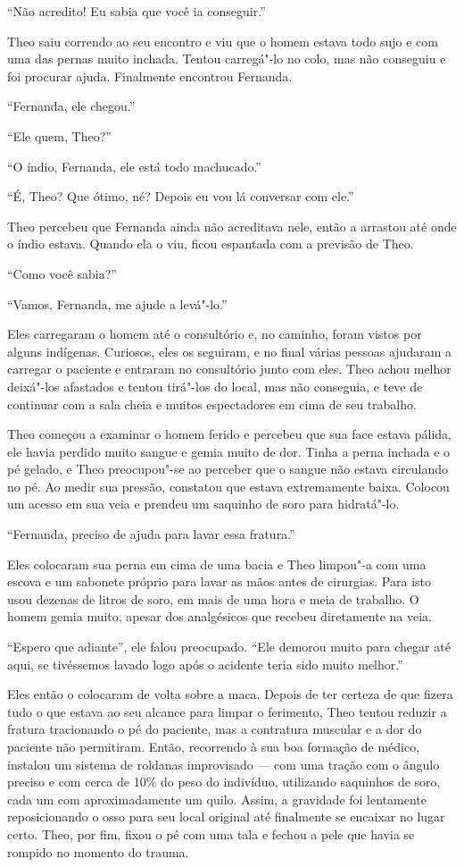 ``Não acredito! Eu sabia que você ia conseguir.''

Theo saiu correndo ao seu encontro e viu que o homem estava todo sujo e
com uma das pernas muito inchada. Tentou carregá"-lo no colo, mas não
conseguiu e foi procurar ajuda. Finalmente encontrou Fernanda.

``Fernanda, ele chegou.''

``Ele quem, Theo?''

``O índio, Fernanda, ele está todo machucado.''

``É, Theo? Que ótimo, né? Depois eu vou lá conversar com ele.''

Theo percebeu que Fernanda ainda não acreditava nele, então a arrastou
até onde o índio estava. Quando ela o viu, ficou espantada com a
previsão de Theo.

``Como você sabia?''

``Vamos, Fernanda, me ajude a levá"-lo.''

Eles carregaram o homem até o consultório e, no caminho, foram
vistos por alguns indígenas. Curiosos, eles os seguiram, e no final várias pessoas ajudaram a carregar o paciente e entraram no
consultório junto com eles. Theo achou melhor deixá"-los afastados e
tentou tirá"-los do local, mas não conseguia, e teve de continuar com a
sala cheia e muitos espectadores em cima de seu trabalho.

Theo começou a examinar o homem ferido e percebeu que sua face estava
pálida, ele havia perdido muito sangue e gemia muito de dor. Tinha a perna
inchada e o pé gelado, e Theo preocupou"-se ao perceber que o sangue não estava
circulando no pé. Ao medir sua pressão, constatou que
estava extremamente baixa. Colocou um acesso em sua veia e prendeu um
saquinho de soro para hidratá"-lo.

``Fernanda, preciso de ajuda para lavar essa fratura.''

Eles colocaram sua perna em cima de uma bacia e Theo limpou"-a com uma
escova e um sabonete próprio para lavar as mãos antes de cirurgias. Para
isto usou dezenas de litros de soro, em mais de uma hora e meia de
trabalho. O homem gemia muito, apesar dos analgésicos que recebeu
diretamente na veia.

``Espero que adiante'', ele falou preocupado. ``Ele demorou muito para
chegar até aqui, se tivéssemos lavado logo após o acidente teria sido
muito melhor.''

Eles então o colocaram de volta sobre a maca. Depois de ter certeza de
que fizera tudo o que estava ao seu alcance para limpar o ferimento, Theo
tentou reduzir a fratura tracionando o pé do paciente, mas a contratura
muscular e a dor do paciente não permitiram. Então, recorrendo à sua boa
formação de médico, instalou um sistema de roldanas improvisado ---
com uma tração com o ângulo preciso e com cerca de 10\% do peso do indivíduo, utilizando saquinhos de soro, cada um com aproximadamente um quilo. Assim, a gravidade
foi lentamente reposicionando o osso para seu local original até finalmente
se encaixar no lugar certo. Theo, por fim, fixou o pé com uma tala e
fechou a pele que havia se rompido no momento do trauma.

